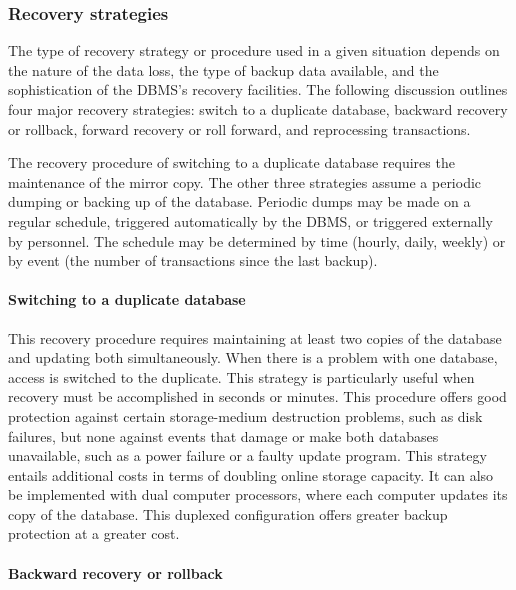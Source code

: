 \documentclass[
]{article}
\begin{document}
\hypertarget{recovery-strategies}{%
\subsubsection*{Recovery strategies}\label{recovery-strategies}}

The type of recovery strategy or procedure used in a given situation
depends on the nature of the data loss, the type of backup data
available, and the sophistication of the DBMS's recovery facilities. The
following discussion outlines four major recovery strategies: switch to
a duplicate database, backward recovery or rollback, forward recovery or
roll forward, and reprocessing transactions.

The recovery procedure of switching to a duplicate database requires the
maintenance of the mirror copy. The other three strategies assume a
periodic dumping or backing up of the database. Periodic dumps may be
made on a regular schedule, triggered automatically by the DBMS, or
triggered externally by personnel. The schedule may be determined by
time (hourly, daily, weekly) or by event (the number of transactions
since the last backup).

\hypertarget{switching-to-a-duplicate-database}{%
\paragraph*{Switching to a duplicate database}\label{switching-to-a-duplicate-database}}

This recovery procedure requires maintaining at least two copies of the
database and updating both simultaneously. When there is a problem with
one database, access is switched to the duplicate. This strategy is
particularly useful when recovery must be accomplished in seconds or
minutes. This procedure offers good protection against certain
storage-medium destruction problems, such as disk failures, but none
against events that damage or make both databases unavailable, such as a
power failure or a faulty update program. This strategy entails
additional costs in terms of doubling online storage capacity. It can
also be implemented with dual computer processors, where each computer
updates its copy of the database. This duplexed configuration offers
greater backup protection at a greater cost.

\hypertarget{backward-recovery-or-rollback}{%
\paragraph*{Backward recovery or rollback}\label{backward-recovery-or-rollback}}
\end{document}
